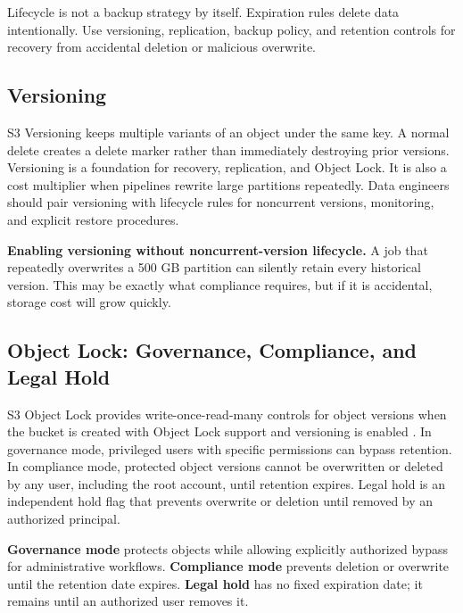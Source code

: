 \begin{notebox}
Lifecycle is not a backup strategy by itself. Expiration rules delete data intentionally. Use versioning, replication, backup policy, and retention controls for recovery from accidental deletion or malicious overwrite.
\end{notebox}

\subsection{Versioning}
S3 Versioning keeps multiple variants of an object under the same key. A normal delete creates a delete marker rather than immediately destroying prior versions. Versioning is a foundation for recovery, replication, and Object Lock. It is also a cost multiplier when pipelines rewrite large partitions repeatedly. Data engineers should pair versioning with lifecycle rules for noncurrent versions, monitoring, and explicit restore procedures.

\begin{pitfall}
\textbf{Enabling versioning without noncurrent-version lifecycle.} A job that repeatedly overwrites a 500 GB partition can silently retain every historical version. This may be exactly what compliance requires, but if it is accidental, storage cost will grow quickly.
\end{pitfall}

\subsection{Object Lock: Governance, Compliance, and Legal Hold}
S3 Object Lock provides write-once-read-many controls for object versions when the bucket is created with Object Lock support and versioning is enabled \cite{awsS3ObjectLock}. In governance mode, privileged users with specific permissions can bypass retention. In compliance mode, protected object versions cannot be overwritten or deleted by any user, including the root account, until retention expires. Legal hold is an independent hold flag that prevents overwrite or deletion until removed by an authorized principal.

\begin{definitionbox}
\textbf{Governance mode} protects objects while allowing explicitly authorized bypass for administrative workflows. \textbf{Compliance mode} prevents deletion or overwrite until the retention date expires. \textbf{Legal hold} has no fixed expiration date; it remains until an authorized user removes it.
\end{definitionbox}

